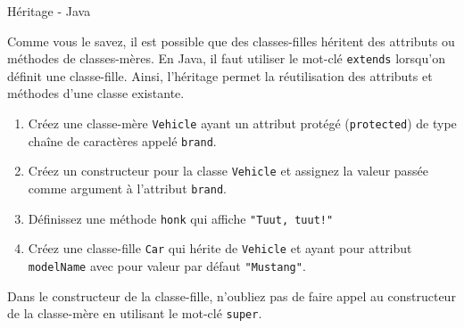 	
\begin{Exercice}[10 minutes]{Héritage - Java}

	Comme vous le savez, il est possible que des classes-filles héritent des attributs ou méthodes de classes-mères.
	En Java, il faut utiliser le mot-clé \lstinline{extends} lorsqu'on définit une classe-fille. Ainsi, l'héritage permet la réutilisation des attributs et méthodes d'une classe existante.

	\begin{enumerate}
		\item Créez une classe-mère \lstinline{Vehicle} ayant un attribut protégé (\lstinline{protected}) de type chaîne de caractères appelé \lstinline{brand}.
		\item Créez un constructeur pour la classe \lstinline{Vehicle} et assignez la valeur passée comme argument à l'attribut \lstinline{brand}.
		\item Définissez une méthode \lstinline{honk} qui affiche \lstinline{"Tuut, tuut!"}
		\item Créez une classe-fille \lstinline{Car} qui hérite de \lstinline{Vehicle} et ayant pour attribut \lstinline{modelName} avec pour valeur par défaut \lstinline{"Mustang"}.
	\end{enumerate}

	\begin{conseil}
		Dans le constructeur de la classe-fille, n'oubliez pas de faire appel au constructeur de la classe-mère en utilisant le mot-clé \lstinline{super}.
	\end{conseil}	
	
	\begin{solution}
		 
	\end{solution}
	\begin{solution}
		 
	\end{solution}
\end{Exercice}

